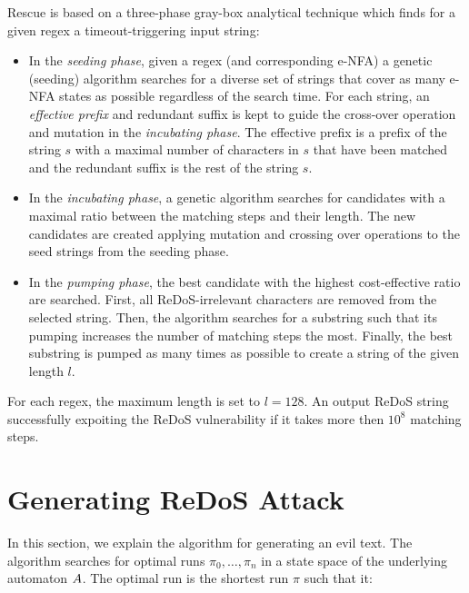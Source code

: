 \documentclass[acmsmall,screen]{acmart}
\begin{document}
%
Rescue is based on a three-phase gray-box analytical technique
which finds for a given regex a timeout-triggering input string:
%
\begin{itemize}
\item In the \emph{seeding phase}, given a regex (and corresponding e-NFA) a genetic (seeding) algorithm searches for a diverse set of strings that cover as many e-NFA states as possible regardless of the search time.
%
For each string, an \emph{effective prefix} and redundant suffix is kept to guide the cross-over operation and mutation in the \emph{incubating phase}.
%
The effective prefix is a prefix of the string $s$ with a maximal number of characters in $s$ that have been matched and the redundant suffix is the rest of the string $s$.

%
\item In the \emph{incubating phase}, a genetic algorithm searches for candidates with a maximal ratio between the matching steps and their length. The new candidates are created applying mutation and crossing over operations to the seed strings from the seeding phase.
\item In the \emph{pumping phase}, the best candidate with the highest cost-effective ratio are searched. First, all  ReDoS-irrelevant characters are removed from the selected string. Then, the algorithm searches for a substring such that its pumping increases the number of matching steps the most. Finally, the best substring is pumped as many times as possible to create a string of the given length $l$.
\end{itemize}
 
For each regex, the maximum length is set to $l = 128$. An output ReDoS string successfully expoiting the ReDoS vulnerability if it takes more then $10^8$ matching steps.




\section{Generating ReDoS Attack}\label{sec:genText}
In this section, we explain the algorithm for generating an evil text. The algorithm searches for optimal runs $\pi_0,\dots,\pi_n$ in a state space of the underlying automaton $A$. The optimal run is the shortest run $\pi$ such that it:
\end{document}
